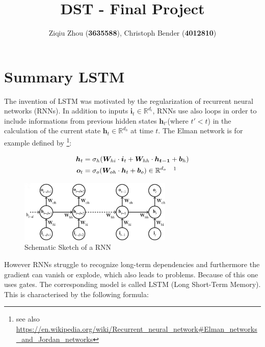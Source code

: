\documentclass{scrarticle}
\title{DST - Final Project}
\author{Ziqiu Zhou (\textbf{3635588}), Christoph Bender (\textbf{4012810})}
\begin{document}
	\maketitle
	\clearpage
	\section{Summary LSTM \cite{Vlachas}}
	The invention of LSTM was motivated by the regularization of recurrent neural networks (RNNs). In addition to inputs $\bm{i}_t \in \mathbb{R}^{d_i}$, RNNs use also loops in order to include informations from previous hidden states $\bm{h}_{t'}$(where $t'<t$) in the calculation of the current state $\bm{h}_t \in \mathbb{R}^{d_h}$ at time $t$. The Elman network \cite{Elman} is for example defined by \footnote{see also \url{https://en.wikipedia.org/wiki/Recurrent_neural_network\#Elman_networks_and_Jordan_networks}}:
	\begin{figure}[h]
	\begin{minipage}[h][3cm][t]{7cm}
	\begin{align}
		\bm{h}_t&=\sigma_h(\bm{W}_{hi}\cdot\bm{i}_t+\bm{W}_{hh}\cdot\bm{h_{t-1}}+\bm{b}_h)\\
		\bm{o}_t&=\sigma_o(\bm{W}_{oh}\cdot\bm{h}_t+\bm{b}_o) \in \mathbb{R}^{d_o} \quad \footnotemark
	\end{align}
	\vfill
	\caption{Schematic Sketch of a RNN \cite{Vlachas}}
	\end{minipage}
	\begin{minipage}[h][3cm][c]{7.5cm}
		\centering
		\includegraphics[width=7.3cm]{images/RNN_Vlachas_cropped.png}
	\end{minipage}
	\end{figure}
	However RNNs struggle to recognize long-term dependencies and furthermore the gradient can vanish or explode, which also leads to problems. Because of this one uses gates. The corresponding model is called LSTM (Long Short-Term Memory). This is characterised by the following formula:
\end{document}
